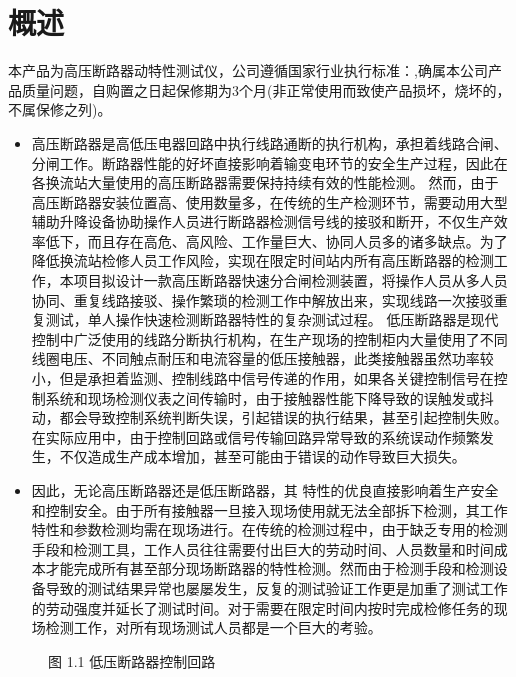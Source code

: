 \documentclass[a4paper,10pt,english]{sphinxmanual}
\begin{document}
\section{概述}
\label{\detokenize{summary:id1}}\label{\detokenize{summary::doc}}
\sphinxAtStartPar
本产品为高压断路器动特性测试仪，公司遵循国家行业执行标准：,确属本公司产品质量问题，自购置之日起保修期为3个月(非正常使用而致使产品损坏，烧坏的，不属保修之列)。
\begin{itemize}
\item {} 
\sphinxAtStartPar
高压断路器是高低压电器回路中执行线路通断的执行机构，承担着线路合闸、分闸工作。断路器性能的好坏直接影响着输变电环节的安全生产过程，因此在各换流站大量使用的高压断路器需要保持持续有效的性能检测。
然而，由于高压断路器安装位置高、使用数量多，在传统的生产检测环节，需要动用大型辅助升降设备协助操作人员进行断路器检测信号线的接驳和断开，不仅生产效率低下，而且存在高危、高风险、工作量巨大、协同人员多的诸多缺点。为了降低换流站检修人员工作风险，实现在限定时间站内所有高压断路器的检测工作，本项目拟设计一款高压断路器快速分合闸检测装置，将操作人员从多人员协同、重复线路接驳、操作繁琐的检测工作中解放出来，实现线路一次接驳重复测试，单人操作快速检测断路器特性的复杂测试过程。
低压断路器是现代控制中广泛使用的线路分断执行机构，在生产现场的控制柜内大量使用了不同线圈电压、不同触点耐压和电流容量的低压接触器，此类接触器虽然功率较小，但是承担着监测、控制线路中信号传递的作用，如果各关键控制信号在控制系统和现场检测仪表之间传输时，由于接触器性能下降导致的误触发或抖动，都会导致控制系统判断失误，引起错误的执行结果，甚至引起控制失败。在实际应用中，由于控制回路或信号传输回路异常导致的系统误动作频繁发生，不仅造成生产成本增加，甚至可能由于错误的动作导致巨大损失。

\item {} 
\sphinxAtStartPar
因此，无论高压断路器还是低压断路器，其  特性的优良直接影响着生产安全和控制安全。由于所有接触器一旦接入现场使用就无法全部拆下检测，其工作特性和参数检测均需在现场进行。在传统的检测过程中，由于缺乏专用的检测手段和检测工具，工作人员往往需要付出巨大的劳动时间、人员数量和时间成本才能完成所有甚至部分现场断路器的特性检测。然而由于检测手段和检测设备导致的测试结果异常也屡屡发生，反复的测试验证工作更是加重了测试工作的劳动强度并延长了测试时间。对于需要在限定时间内按时完成检修任务的现场检测工作，对所有现场测试人员都是一个巨大的考验。

\end{itemize}

\begin{figure}[htbp]
\centering
\capstart

\noindent{}
\caption{图 1.1 低压断路器控制回路}\label{\detokenize{summary:id2}}\end{figure}
\end{document}
